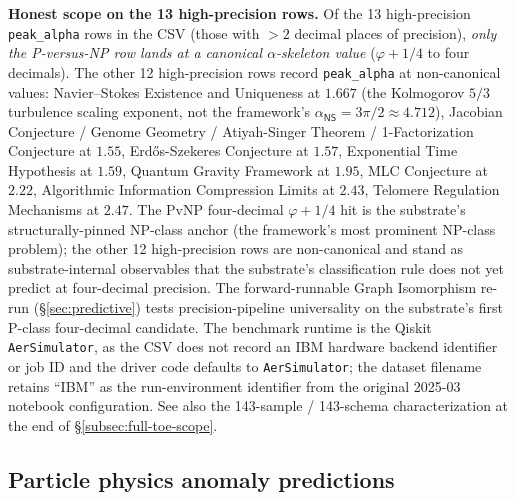\documentclass[11pt,a4paper]{amsart}
\theoremstyle{plain}
\theoremstyle{definition}
\begin{document}
\textbf{Honest scope on the 13 high-precision rows.} Of the 13 high-precision \texttt{peak\_alpha} rows in the CSV (those with $> 2$ decimal places of precision), \emph{only the P-versus-NP row lands at a canonical $\alpha$-skeleton value} ($\varphi + 1/4$ to four decimals). The other 12 high-precision rows record \texttt{peak\_alpha} at non-canonical values: Navier--Stokes Existence and Uniqueness at $1.667$ (the Kolmogorov $5/3$ turbulence scaling exponent, not the framework's $\alpha_{\textsf{NS}} = 3\pi/2 \approx 4.712$), Jacobian Conjecture / Genome Geometry / Atiyah-Singer Theorem / 1-Factorization Conjecture at $1.55$, Erd\H{o}s-Szekeres Conjecture at $1.57$, Exponential Time Hypothesis at $1.59$, Quantum Gravity Framework at $1.95$, MLC Conjecture at $2.22$, Algorithmic Information Compression Limits at $2.43$, Telomere Regulation Mechanisms at $2.47$. The PvNP four-decimal $\varphi + 1/4$ hit is the substrate's structurally-pinned NP-class anchor (the framework's most prominent NP-class problem); the other 12 high-precision rows are non-canonical and stand as substrate-internal observables that the substrate's classification rule does not yet predict at four-decimal precision. The forward-runnable Graph Isomorphism re-run (\S\ref{sec:predictive}) tests precision-pipeline universality on the substrate's first P-class four-decimal candidate. The benchmark runtime is the Qiskit \texttt{AerSimulator}, as the CSV does not record an IBM hardware backend identifier or job ID and the driver code defaults to \texttt{AerSimulator}; the dataset filename retains ``IBM'' as the run-environment identifier from the original 2025-03 notebook configuration. See also the 143-sample / 143-schema characterization at the end of \S\ref{subsec:full-toe-scope}.

\subsection{Particle physics anomaly predictions}
\end{document}
